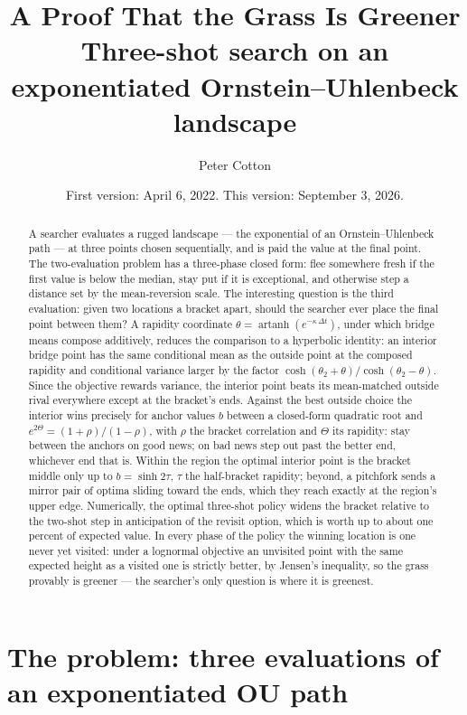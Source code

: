 \documentclass[11pt]{article}
\title{A Proof That the Grass Is Greener\\[4pt]
{\large Three-shot search on an exponentiated Ornstein--Uhlenbeck landscape}}
\author{Peter Cotton}
\date{\normalsize First version: April 6, 2022. This version: September 3, 2026.}
\theoremstyle{itheads}
\newcommand{\artanh}{\operatorname{artanh}}
\begin{document}
\maketitle

\begin{abstract}
\noindent A searcher evaluates a rugged landscape --- the exponential of an
Ornstein--Uhlenbeck path --- at three points chosen sequentially, and is
paid the value at the final point. The two-evaluation problem has a
three-phase closed form: flee somewhere fresh if the first value is below
the median, stay put if it is exceptional, and otherwise step a distance
set by the mean-reversion scale. The interesting question is the third
evaluation: given two locations a bracket apart, should the searcher ever
place the final point between them? A rapidity coordinate
$\theta=\artanh(e^{-\kappa\,\Delta t})$, under which bridge means compose
additively, reduces the comparison to a hyperbolic identity: an interior
bridge point has the same conditional mean as the outside point at the
composed rapidity and conditional variance larger by the factor
$\cosh(\theta_2+\theta)/\cosh(\theta_2-\theta)$. Since the objective
rewards variance, the interior point beats its mean-matched outside
rival everywhere except at the bracket's ends. Against the best outside
choice the interior wins precisely for anchor values $b$ between a
closed-form quadratic root and $e^{2\Theta}=(1+\rho)/(1-\rho)$, with
$\rho$ the bracket correlation and $\Theta$ its rapidity: stay between
the anchors on good news; on bad news step out past the better end,
whichever end that is. Within the region the optimal interior point is
the bracket middle only up to $b=\sinh 2\tau$, $\tau$ the half-bracket
rapidity; beyond, a pitchfork sends a mirror pair of optima sliding
toward the ends, which they reach exactly at the region's upper edge.
Numerically, the optimal three-shot policy widens the
bracket relative to the two-shot step in anticipation of the revisit
option, which is worth up to about one percent of expected value. In
every phase of the policy the winning location is one never yet
visited: under a lognormal objective an unvisited point with the same
expected height as a visited one is strictly better, by Jensen's
inequality, so the grass provably is greener --- the searcher's only
question is where it is greenest.
\end{abstract}

\section{The problem: three evaluations of an exponentiated OU path}
\end{document}
